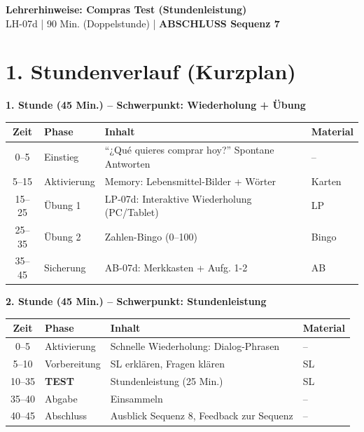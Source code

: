 \documentclass[11pt, a4paper]{article}
\newcommand{\fachfarbe}{spanisch}
\newcommand{\thema}{Compras Test (Stundenleistung)}
\newcommand{\sequenz}{07}
\newcommand{\block}{d}
\newcommand{\dauer}{90 Min. (Doppelstunde)}
\begin{document}
\begin{center}
    {\Large\bfseries\textcolor{\fachfarbe}{Lehrerhinweise: \thema}}\\[0.3em]
    {\normalsize LH-\sequenz\block{} | \dauer{} | \textbf{ABSCHLUSS Sequenz 7}}
\end{center}

\vspace{10pt}

\section*{1. Stundenverlauf (Kurzplan)}

\textbf{1. Stunde (45 Min.) -- Schwerpunkt: Wiederholung + Übung}

\begin{tabularx}{\textwidth}{|c|l|X|l|}
\hline
\textbf{Zeit} & \textbf{Phase} & \textbf{Inhalt} & \textbf{Material} \\
\hline
0--5 & Einstieg & ``¿Qué quieres comprar hoy?'' Spontane Antworten & -- \\
\hline
5--15 & Aktivierung & Memory: Lebensmittel-Bilder + Wörter & Karten \\
\hline
15--25 & Übung 1 & LP-07d: Interaktive Wiederholung (PC/Tablet) & LP \\
\hline
25--35 & Übung 2 & Zahlen-Bingo (0--100) & Bingo \\
\hline
35--45 & Sicherung & AB-07d: Merkkasten + Aufg. 1-2 & AB \\
\hline
\end{tabularx}

\vspace{1em}

\textbf{2. Stunde (45 Min.) -- Schwerpunkt: Stundenleistung}

\begin{tabularx}{\textwidth}{|c|l|X|l|}
\hline
\textbf{Zeit} & \textbf{Phase} & \textbf{Inhalt} & \textbf{Material} \\
\hline
0--5 & Aktivierung & Schnelle Wiederholung: Dialog-Phrasen & -- \\
\hline
5--10 & Vorbereitung & SL erklären, Fragen klären & SL \\
\hline
10--35 & \textbf{TEST} & Stundenleistung (25 Min.) & SL \\
\hline
35--40 & Abgabe & Einsammeln & -- \\
\hline
40--45 & Abschluss & Ausblick Sequenz 8, Feedback zur Sequenz & -- \\
\hline
\end{tabularx}
\end{document}
